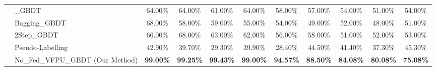 \begin{table}
\begin{tabular}{llccccccccc}
							 & \_GBDT                           & 64.00\%          & 64.00\%          & 61.00\%          & 64.00\%          & 58.00\%          & 57.00\%          & 54.00\%          & 51.00\%          & 54.00\%           \\
							 & Bagging\_GBDT                    & 68.00\%          & 58.00\%          & 59.00\%          & 55.00\%          & 54.00\%          & 49.00\%          & 52.00\%          & 48.00\%          & 51.00\%           \\
							 & 2Step\_GBDT                      & 66.00\%          & 68.00\%          & 63.00\%          & 62.00\%          & 56.00\%          & 58.00\%          & 51.00\%          & 52.00\%          & 53.00\%           \\
							 & Pseudo-Labelling                 & 42.90\%          & 39.70\%          & 29.30\%          & 39.90\%          & 28.40\%          & 44.50\%          & 41.40\%          & 37.30\%          & 45.30\%           \\
							 & No\_Fed\_VFPU\_GBDT (Our Method) & \textbf{99.00\%} & \textbf{99.25\%} & \textbf{99.43\%} & \textbf{99.00\%} & \textbf{94.57\%} & \textbf{88.50\%} & \textbf{84.08\%} & \textbf{80.08\%} & \textbf{75.08\%}  \\
	\hline
	\end{tabular}
\end{table}





